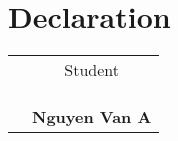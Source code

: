 \chapter*{Declaration}


\begin{table}[!ht]
\begin{tabular}{p{}c}
 & Student \\
 &              \\
 &              \\
 &              \\
 &  \textbf{Nguyen Van A} 
\end{tabular}
\end{table}